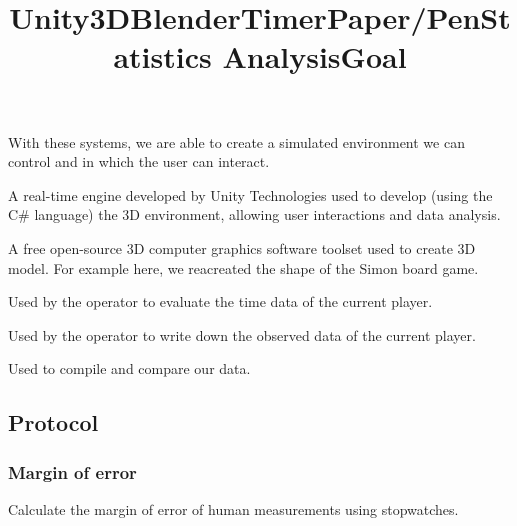 \documentclass[12pt, openany, twocolumn]{article}
\begin{document}
        \noindent With these systems, we are able to create a simulated environment we can control and in which the user can interact. \\
    
        \noindent \title{\textbf{Unity3D}} \vspace{0.25cm}

        \noindent A real-time engine developed by Unity Technologies used to develop (using the C\# language) the 3D environment, allowing user interactions and data analysis. \\

        \noindent \title{\textbf{Blender}} \vspace{0.25cm}

        \noindent A free open-source 3D computer graphics software toolset used to create 3D model. For example here, we reacreated the shape of the Simon board game. \\
        
        \noindent \title{\textbf{Timer}} \vspace{0.25cm}

        \noindent Used by the operator to evaluate the time data of the current player. \\

        \noindent \title{\textbf{Paper/Pen}} \vspace{0.25cm}

        \noindent Used by the operator to write down the observed data of the current player. \\
    
        \noindent \title{\textbf{Statistics Analysis}} \vspace{0.25cm}

        \noindent Used to compile and compare our data. \\

    \subsection{Protocol}
        \subsubsection{Margin of error}
            \title{\textbf{Goal}} \vspace{0.25cm}

            \noindent Calculate the margin of error of human measurements using stopwatches.
            \\
\end{document}
